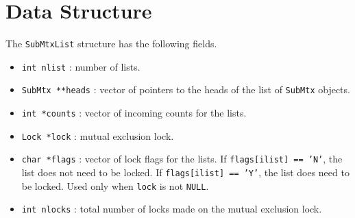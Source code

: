 \par
\section{Data Structure}
\label{section:SubMtxList:dataStructure}
\par
\par
The {\tt SubMtxList} structure has the following fields.
\begin{itemize}
\item
{\tt int nlist} : number of lists.
\item
{\tt SubMtx **heads} : 
vector of pointers to the heads of the list of {\tt SubMtx} objects.
\item
{\tt int *counts} : vector of incoming counts for the lists.
\item
{\tt Lock *lock} : mutual exclusion lock.
\item
{\tt char *flags} : vector of lock flags for the lists.
If {\tt flags[ilist] == 'N'}, the list does not need to be locked.
If {\tt flags[ilist] == 'Y'}, the list does need to be locked.
Used only when {\tt lock} is not {\tt NULL}.
\item
{\tt int nlocks} : 
total number of locks made on the mutual exclusion lock.
\end{itemize}
